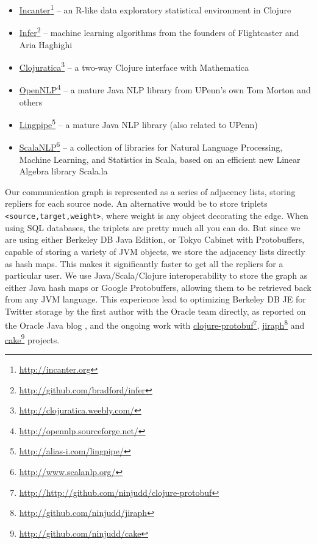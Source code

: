 \documentclass[10pt,oneside]{memoir}
\begin{document}
\begin{itemize}


\item \href{http://incanter.org}{Incanter}\footnote{\href{http://incanter.org}{http://incanter.org}} -- an R-like data exploratory statistical environment in Clojure

\item \href{http://github.com/bradford/infer}{Infer}\footnote{\href{http://github.com/bradford/infer}{http://github.com/bradford/infer}} -- machine learning algorithms from the founders of Flightcaster and Aria Haghighi

\item \href{http://clojuratica.weebly.com/}{Clojuratica}\footnote{\href{http://clojuratica.weebly.com/}{http://clojuratica.weebly.com/}} -- a two-way Clojure interface with Mathematica

\item \href{http://opennlp.sourceforge.net/}{OpenNLP}\footnote{\href{http://opennlp.sourceforge.net/}{http://opennlp.sourceforge.net/}} -- a mature Java NLP library from UPenn's own Tom Morton and others

\item \href{http://alias-i.com/lingpipe/}{Lingpipe}\footnote{\href{http://alias-i.com/lingpipe/}{http://alias-i.com/lingpipe/}} -- a mature Java NLP library (also related to UPenn)

\item \href{http://www.scalanlp.org/}{ScalaNLP}\footnote{\href{http://www.scalanlp.org/}{http://www.scalanlp.org/}}  -- a collection of libraries for Natural Language Processing, Machine Learning, and Statistics in Scala, based on an efficient new Linear Algebra library Scala.la
\end{itemize}

Our communication graph is represented as a series of adjacency lists, storing repliers for each source node. An alternative would be to store triplets \texttt{<source,target,weight>}, where weight is any object decorating the edge. When using SQL databases, the triplets are pretty much all you can do. But since we are using either Berkeley DB Java Edition, or Tokyo Cabinet with Protobuffers, capable of storing a variety of JVM objects, we store the adjacency lists directly as hash maps. This makes it significantly faster to get all the repliers for a particular user. We use Java/Scala/Clojure interoperability to store the graph as either Java hash maps or Google Protobuffers, allowing them to be retrieved back from any JVM language. This experience lead to optimizing Berkeley DB JE for Twitter storage by the first author with the Oracle team directly, as reported on the Oracle Java blog \cite{OracleBlog:Khrabrov}, and the ongoing work with \href{http://http://github.com/ninjudd/clojure-protobuf}{clojure-protobuf}\footnote{\href{http://http://github.com/ninjudd/clojure-protobuf}{http://http://github.com/ninjudd/clojure-protobuf}}, \href{http://github.com/ninjudd/jiraph}{jiraph}\footnote{\href{http://github.com/ninjudd/jiraph}{http://github.com/ninjudd/jiraph}} and \href{http://github.com/ninjudd/cake}{cake}\footnote{\href{http://github.com/ninjudd/cake}{http://github.com/ninjudd/cake}} projects.
\end{document}
